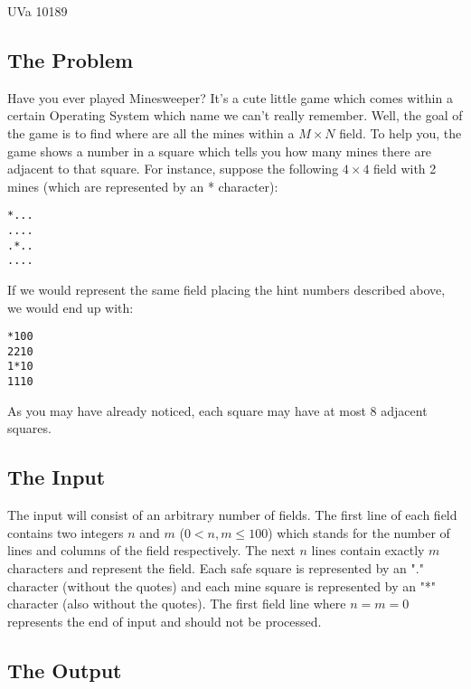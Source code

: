  

\noindent
UVa 10189\bigskip

\subsection*{The Problem}

Have you ever played Minesweeper? It's a cute little game which comes within a certain 
Operating System which name we can't really remember. Well, the goal of the game is to
find where are all the mines within a $M \times N$ field. To help you, the game shows a number
in a square which tells you how many mines there are adjacent to that square. For instance,
suppose the following $4 \times 4$ field with 2 mines (which are represented by an * character):

\begin{verbatim}
*...
....
.*..
....
\end{verbatim}

If we would represent the same field placing the hint numbers described above, we would end up with:

\begin{verbatim}
*100
2210
1*10
1110
\end{verbatim}

As you may have already noticed, each square may have at most 8 adjacent squares.

\subsection*{The Input}

The input will consist of an arbitrary number of fields. The first line of each field contains
two integers $n$ and $m$ ($0 < n,m \leqslant 100$) which stands for the number of lines and columns of the field
respectively. The next $n$ lines contain exactly $m$ characters and represent the field. Each safe
square is represented by an "." character (without the quotes) and each mine square is represented
by an "*" character (also without the quotes). The first field line where $n = m = 0$ represents the end 
of input and should not be processed.

\subsection*{The Output}

